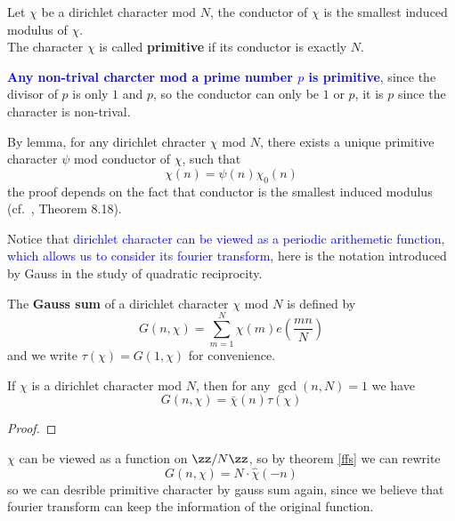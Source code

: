 \begin{colordefinition}
    Let \(\chi\) be a dirichlet character mod \(N\), the conductor of \(\chi\) is the smallest induced modulus of \(\chi\).\\

    The character \(\chi\) is called \textbf{primitive} if its conductor is exactly \(N\).
\end{colordefinition}

\begin{remark}
    \textcolor{blue}{\textbf{Any non-trival charcter mod a prime number \(p\) is primitive}}, since the divisor of \(p\) is only \(1\) and \(p\), so the conductor can only be \(1\) or \(p\), it is \(p\) since the character is non-trival.
\end{remark}

\begin{remark}
    By lemma, for any dirichlet chracter \(\chi\) mod \(N\), there exists a unique primitive character \(\psi\) mod conductor of \(\chi\), such that 
    \[\chi(n) = \psi(n)\chi_0(n)\]
    the proof depends on the fact that conductor is the smallest induced modulus (cf.~\cite{Apostol}, Theorem 8.18).
\end{remark}

Notice that \textcolor{blue}{ dirichlet character can be viewed as a periodic arithemetic function, which allows us to consider its fourier transform}, here is the notation introduced by Gauss in the study of quadratic reciprocity.

\begin{colordefinition}
    The \textbf{Gauss sum} of a dirichlet character \(\chi\) mod \(N\) is defined by
    \[G(n,\chi) = \sum_{m = 1}^N \chi(m) e(\frac{mn}{N})\]
    and we write \(\tau(\chi) = G(1,\chi)\) for convenience.
\end{colordefinition}



\begin{lemma}
    If \(\chi\) is a dirichlet character mod \(N\), then for any \(\gcd(n,N) = 1\) we have
    \[G(n,\chi) = \bar{\chi}(n)\tau(\chi)\]
\end{lemma}

\begin{proof}
    
\end{proof}


    \(\chi\) can be viewed as a function on \(\zz/N\zz\), so by theorem \ref{ffs} we can rewrite
    \[G(n,\chi) = N \cdot \hat{\chi}(-n) \]
    so we can desrible primitive character by gauss sum again, since we believe that fourier transform can keep the information of the original function.

